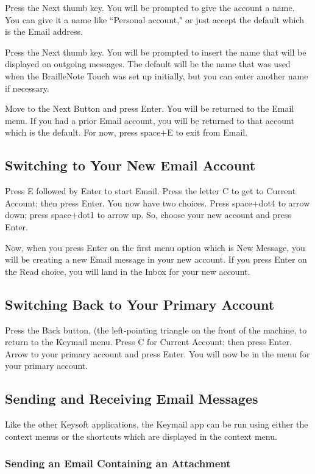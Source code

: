 \documentclass[10pt,letterpaper,twoside]{report}
\begin{document}
{{{Press the Next thumb key. You will be prompted to give the account a name. You can give it a name like ``Personal account," or just accept the default which is the Email address.

Press the Next thumb key. You will be prompted to insert the name that will be displayed on outgoing messages. The default will be the name that was used when the BrailleNote Touch was set up initially, but you can enter another name if necessary.

Move to the Next Button and press Enter. You will be returned to the Email menu. If you had a prior Email account, you will be returned to that account which is the default. For now, press space+E to exit from Email.

\subsection{Switching to Your New Email Account}

Press E followed by Enter to start Email.
Press the letter C to get to Current Account; then press Enter. You now have two choices.
Press space+dot4 to arrow down; press space+dot1 to arrow up.
So, choose your new account and press Enter.

Now, when you press Enter on the first menu option which is New Message, you will be creating a new Email message in your new account.
If you press Enter on the Read choice, you will land in the Inbox for your new account.

\subsection{Switching Back to Your Primary Account}

Press the Back button, (the left-pointing triangle on the front of the machine, to return to the Keymail menu.
Press C for Current Account; then press Enter.
Arrow to your primary account and press Enter. You will now be in the menu for your primary account.

\subsection{Sending and Receiving Email Messages}

Like the other Keysoft applications, the Keymail app can be run using either the context menus or the shortcuts which are displayed in the context menu.

\subsubsection{Sending an Email Containing an Attachment}

}}}
\end{document}
